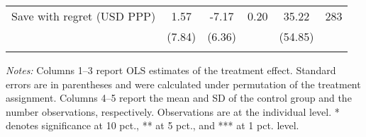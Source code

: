 \begin{table}[h]
{\begin{threeparttable}
\begin{tabular}{l*{5}{c}}
Save with regret (USD PPP)&     1.57&    -7.17&     0.20&    35.22&      283\\
          &   (7.84)&   (6.36)&         &  (54.85)&         \\
          &         &         &         &         &         \\
\bottomrule \end{tabular} \begin{tablenotes}[flushleft] \footnotesize \item \emph{Notes:} Columns 1--3 report OLS estimates of the treatment effect. Standard errors are in parentheses and were calculated under permutation of the treatment assignment. Columns 4--5 report the mean and SD of the control group and the number observations, respectively. Observations are at the individual level. * denotes significance at 10 pct., ** at 5 pct., and *** at 1 pct. level. \end{tablenotes} \end{threeparttable} } \end{table}

